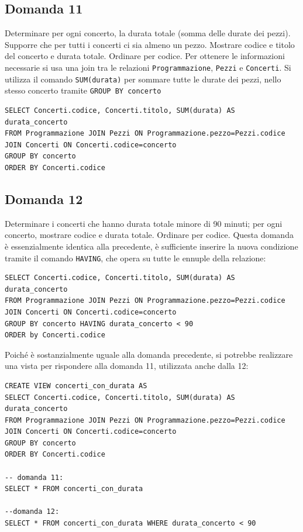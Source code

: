 \documentclass{article}
\numberwithin{equation}{subsection}
\begin{document}
\subsection{Domanda 11}
Determinare per ogni concerto, la durata totale (somma delle durate dei pezzi). Supporre che per tutti i concerti ci sia almeno un pezzo. Mostrare codice e titolo del concerto e durata totale. Ordinare per codice. 
Per ottenere le informazioni necessarie si usa una join tra le relazioni \verb|Programmazione|, \verb|Pezzi| e \verb|Concerti|. Si utilizza il comando \verb|SUM(durata)| per sommare tutte le durate dei pezzi, nello 
stesso concerto tramite \verb|GROUP BY concerto|  
\begin{verbatim}
SELECT Concerti.codice, Concerti.titolo, SUM(durata) AS durata_concerto
FROM Programmazione JOIN Pezzi ON Programmazione.pezzo=Pezzi.codice
JOIN Concerti ON Concerti.codice=concerto
GROUP BY concerto
ORDER BY Concerti.codice
\end{verbatim}

\subsection{Domanda 12}
Determinare i concerti che hanno durata totale minore di 90 minuti; per ogni concerto, mostrare codice e durata totale. Ordinare per codice. Questa domanda è essenzialmente identica alla precedente, è 
sufficiente inserire la nuova condizione tramite il comando \verb|HAVING|, che opera su tutte le ennuple della relazione: 
\begin{verbatim}
SELECT Concerti.codice, Concerti.titolo, SUM(durata) AS durata_concerto
FROM Programmazione JOIN Pezzi ON Programmazione.pezzo=Pezzi.codice
JOIN Concerti ON Concerti.codice=concerto
GROUP BY concerto HAVING durata_concerto < 90
ORDER by Concerti.codice
\end{verbatim}
Poiché è sostanzialmente uguale alla domanda precedente, si potrebbe realizzare una vista per rispondere alla domanda 11, utilizzata anche dalla 12:
\begin{verbatim}
CREATE VIEW concerti_con_durata AS
SELECT Concerti.codice, Concerti.titolo, SUM(durata) AS durata_concerto
FROM Programmazione JOIN Pezzi ON Programmazione.pezzo=Pezzi.codice
JOIN Concerti ON Concerti.codice=concerto
GROUP BY concerto
ORDER BY Concerti.codice

-- domanda 11:
SELECT * FROM concerti_con_durata

--domanda 12:
SELECT * FROM concerti_con_durata WHERE durata_concerto < 90
\end{verbatim}
\end{document}
